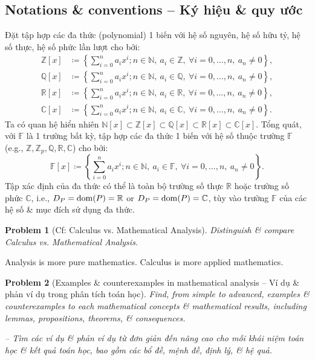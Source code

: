 \documentclass{article}
\newtheorem{problem}{Problem}
\begin{document}
\subsection{Notations \& conventions -- Ký hiệu \& quy ước}
Đặt tập hợp các đa thức (polynomial) 1 biến với hệ số nguyên, hệ số hữu tỷ, hệ số thực, hệ số phức lần lượt cho bởi:
\begin{align*}
	\mathbb{Z}[x]&\coloneqq\left\{\sum_{i=0}^n a_ix^i;n\in\mathbb{N},\ a_i\in\mathbb{Z},\ \forall i = 0,\ldots,n,\ a_n\ne0\right\},\\
	\mathbb{Q}[x]&\coloneqq\left\{\sum_{i=0}^n a_ix^i;n\in\mathbb{N},\ a_i\in\mathbb{Q},\ \forall i = 0,\ldots,n,\ a_n\ne0\right\},\\
	\mathbb{R}[x]&\coloneqq\left\{\sum_{i=0}^n a_ix^i;n\in\mathbb{N},\ a_i\in\mathbb{R},\ \forall i = 0,\ldots,n,\ a_n\ne0\right\},\\
	\mathbb{C}[x]&\coloneqq\left\{\sum_{i=0}^n a_ix^i;n\in\mathbb{N},\ a_i\in\mathbb{C},\ \forall i = 0,\ldots,n,\ a_n\ne0\right\}.
\end{align*}
Ta có quan hệ hiển nhiên $\mathbb{N}[x]\subset\mathbb{Z}[x]\subset\mathbb{Q}[x]\subset\mathbb{R}[x]\subset\mathbb{C}[x]$. Tổng quát, với $\mathbb{F}$ là 1 trường bất kỳ, tập hợp các đa thức 1 biến với hệ số thuộc trường $\mathbb{F}$ (e.g., $\mathbb{Z},\mathbb{Z}_p,\mathbb{Q},\mathbb{R},\mathbb{C}$) cho bởi:
\begin{equation*}
	\mathbb{F}[x]\coloneqq\left\{\sum_{i=0}^n a_ix^i;n\in\mathbb{N},\ a_i\in\mathbb{F},\ \forall i = 0,\ldots,n,\ a_n\ne0\right\}.
\end{equation*}
Tập xác định của đa thức có thể là toàn bộ trường số thực $\mathbb{R}$ hoặc trường số phức $\mathbb{C}$, i.e., $D_P = {\rm dom}(P) = \mathbb{R}$ or $D_P = {\rm dom}(P) = \mathbb{C}$, tùy vào trường $\mathbb{F}$ của các hệ số \& mục đích sử dụng đa thức.

\begin{problem}[Cf: Calculus vs. Mathematical Analysis]
	Distinguish \& compare Calculus vs. Mathematical Analysis.
\end{problem}
Analysis is more pure mathematics. Calculus is more applied mathematics.

\begin{problem}[Examples \& counterexamples in mathematical analysis -- Ví dụ \& phản ví dụ trong phân tích toán học]
	Find, from simple to advanced, examples \& counterexamples to each mathematical concepts \& mathematical results, including lemmas, propositions, theorems, \& consequences.
	
	-- Tìm các ví dụ \& phản ví dụ từ đơn giản đến nâng cao cho mỗi khái niệm toán học \& kết quả toán học, bao gồm các bổ đề, mệnh đề, định lý, \& hệ quả.
\end{problem}
\end{document}
